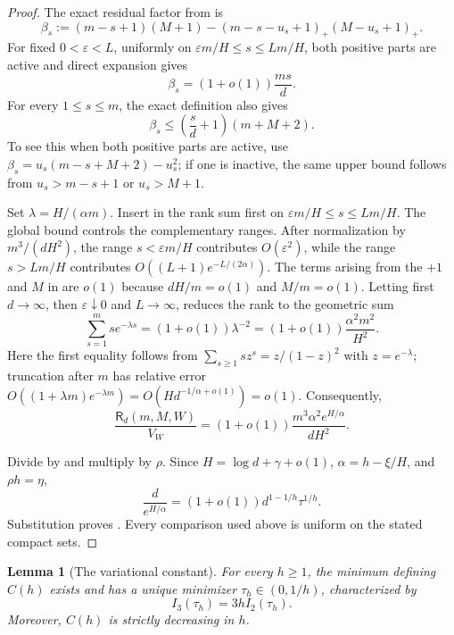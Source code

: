\documentclass[11pt,letterpaper]{article}
\newtheorem{lemma}[lemma]{Lemma}
\theoremstyle{definition}
\newcommand{\positive}[1]{\left(#1\right)_{+}}
\begin{document}
\begin{proof}
The exact residual factor from  is
\[
  \beta_s:=(m-s+1)(M+1)
  -\positive{m-s-u_s+1}\positive{M-u_s+1}.
\]
For fixed $0<\varepsilon<L$, uniformly on
$\varepsilon m/H\leq s\leq Lm/H$, both positive parts are active and
direct expansion gives
\begin{equation}
  \beta_s=(1+o(1))\frac{ms}{d}.
  \label{eq:boundary-beta-window}
\end{equation}
For every $1\leq s\leq m$, the exact definition also gives
\begin{equation}
  \beta_s\leq\left(\frac sd+1\right)(m+M+2).
  \label{eq:boundary-beta-global}
\end{equation}
To see this when both positive parts are active, use
$\beta_s=u_s(m-s+M+2)-u_s^2$; if one is inactive, the same upper bound
follows from $u_s>m-s+1$ or $u_s>M+1$.

Set $\lambda=H/(\alpha m)$. Insert
 in the
rank sum first on
$\varepsilon m/H\leq s\leq Lm/H$. The global bound
 controls the complementary ranges. After
normalization by $m^3/(dH^2)$, the range $s<\varepsilon m/H$ contributes
$O(\varepsilon^2)$, while the range $s>Lm/H$ contributes
$O((L+1)e^{-L/(2\alpha)})$. The terms arising from the $+1$ and $M$ in
 are $o(1)$ because
$dH/m=o(1)$ and $M/m=o(1)$. Letting first $d\to\infty$, then
$\varepsilon\downarrow0$ and $L\to\infty$, reduces the rank to the
geometric sum
\[
  \sum_{s=1}^{m}s e^{-\lambda s}
  =(1+o(1))\lambda^{-2}
  =(1+o(1))\frac{\alpha^2m^2}{H^2}.
\]
Here the first equality follows from
$\sum_{s\geq1}sz^s=z/(1-z)^2$ with $z=e^{-\lambda}$; truncation after
$m$ has relative error
$O((1+\lambda m)e^{-\lambda m})
=O(Hd^{-1/\alpha+o(1)})=o(1)$.
Consequently,
\begin{equation}
  \frac{\mathsf R_d(m,M,W)}{V_W}
  =
  (1+o(1))
  \frac{m^3\alpha^2e^{H/\alpha}}{dH^2}.
  \label{eq:boundary-rank-asymptotic}
\end{equation}

Divide  by
 and multiply by $\rho $. Since
$H=\log d+\gamma+o(1)$, $\alpha=h-\xi/H$, and $\rho h=\eta$,
\[
  \frac{d}{e^{H/\alpha}}
  =(1+o(1))d^{1-1/h}\tau^{1/h}.
\]
Substitution proves . Every comparison used above
is uniform on the stated compact sets.
\end{proof}

\begin{lemma}[The variational constant]
\label{lem:boundary-constant}
For every $h\ge1$, the minimum defining $C(h)$ exists and has a unique
minimizer \(\tau_h\in(0,1/h)\), characterized by
\begin{equation}
  I_3(\tau_h)=3hI_2(\tau_h).
  \label{eq:boundary-stationarity}
\end{equation}
Moreover, $C(h)$ is strictly decreasing in $h$.
\end{lemma}
\end{document}
